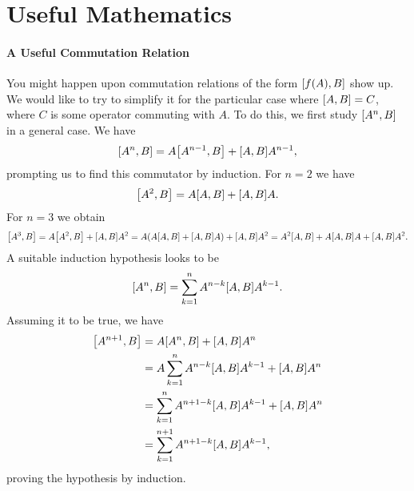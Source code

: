 \section{Useful Mathematics}

\paragraph{A Useful Commutation Relation}
You might happen upon commutation relations of the form $\comm{f(A)}{B}$ show up. We would like to try to simplify it for the particular case where $\comm{A}{B} = C$, where $C$ is some operator commuting with $A$. To do this, we first study $\comm{A^{n}}{B}$ in a general case. We have
\begin{align*}
	\comm{A^{n}}{B} = A\comm{A^{n - 1}}{B} + \comm{A}{B}A^{n - 1},
\end{align*}
prompting us to find this commutator by induction. For $n = 2$ we have
\begin{align*}
	\comm{A^{2}}{B} = A\comm{A}{B} + \comm{A}{B}A.
\end{align*}
For $n = 3$ we obtain
\begin{align*}
	\comm{A^{3}}{B} = A\comm{A^{2}}{B} + \comm{A}{B}A^{2} = A(A\comm{A}{B} + \comm{A}{B}A) + \comm{A}{B}A^{2} = A^{2}\comm{A}{B} + A\comm{A}{B}A + \comm{A}{B}A^{2}.
\end{align*}
A suitable induction hypothesis looks to be
\begin{align*}
	\comm{A^{n}}{B} = \sum\limits_{k = 1}^{n}A^{n - k}\comm{A}{B}A^{k - 1}.
\end{align*}
Assuming it to be true, we have
\begin{align*}
	\comm{A^{n + 1}}{B} &= A\comm{A^{n}}{B} + \comm{A}{B}A^{n} \\
	                    &= A\sum\limits_{k = 1}^{n}A^{n - k}\comm{A}{B}A^{k - 1} + \comm{A}{B}A^{n} \\
	                    &= \sum\limits_{k = 1}^{n}A^{n + 1 - k}\comm{A}{B}A^{k - 1} + \comm{A}{B}A^{n} \\
	                    &= \sum\limits_{k = 1}^{n + 1}A^{n + 1 - k}\comm{A}{B}A^{k - 1},
\end{align*}
proving the hypothesis by induction.

